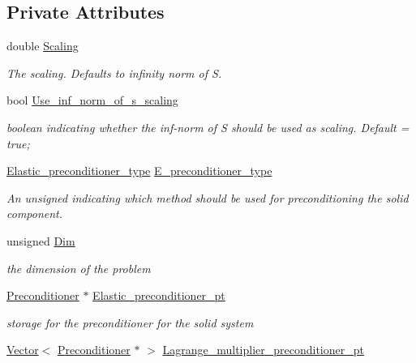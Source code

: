 \subsection*{Private Attributes}
\begin{DoxyCompactItemize}
\item 
double \hyperlink{classoomph_1_1PseudoElasticPreconditionerOld_a563f753bed7b33a169ec15b796864eba}{Scaling}
\begin{DoxyCompactList}\small\item\em The scaling. Defaults to infinity norm of S. \end{DoxyCompactList}\item 
bool \hyperlink{classoomph_1_1PseudoElasticPreconditionerOld_a475f2a2576128e4a17ee494343438ba5}{Use\+\_\+inf\+\_\+norm\+\_\+of\+\_\+s\+\_\+scaling}
\begin{DoxyCompactList}\small\item\em boolean indicating whether the inf-\/norm of S should be used as scaling. Default = true; \end{DoxyCompactList}\item 
\hyperlink{classoomph_1_1PseudoElasticPreconditionerOld_a6748360e3e2fbd4766d837a520dadfd0}{Elastic\+\_\+preconditioner\+\_\+type} \hyperlink{classoomph_1_1PseudoElasticPreconditionerOld_a4cb348ca052099063282dc8adb76d5fc}{E\+\_\+preconditioner\+\_\+type}
\begin{DoxyCompactList}\small\item\em An unsigned indicating which method should be used for preconditioning the solid component. \end{DoxyCompactList}\item 
unsigned \hyperlink{classoomph_1_1PseudoElasticPreconditionerOld_a61d6f0e7db9902aa2bde14bfdf933bae}{Dim}
\begin{DoxyCompactList}\small\item\em the dimension of the problem \end{DoxyCompactList}\item 
\hyperlink{classoomph_1_1Preconditioner}{Preconditioner} $\ast$ \hyperlink{classoomph_1_1PseudoElasticPreconditionerOld_a14f587c9c01c392b14c235bde00453b3}{Elastic\+\_\+preconditioner\+\_\+pt}
\begin{DoxyCompactList}\small\item\em storage for the preconditioner for the solid system \end{DoxyCompactList}\item 
\hyperlink{classoomph_1_1Vector}{Vector}$<$ \hyperlink{classoomph_1_1Preconditioner}{Preconditioner} $\ast$ $>$ \hyperlink{classoomph_1_1PseudoElasticPreconditionerOld_a14f5c801cd3c9128705902002efe51e8}{Lagrange\+\_\+multiplier\+\_\+preconditioner\+\_\+pt}

\end{DoxyCompactItemize}
